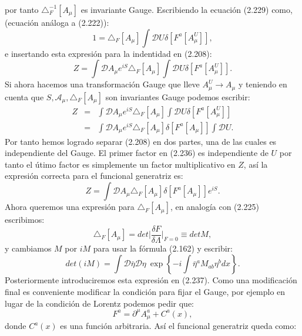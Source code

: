 por tanto $\triangle_{F}^{-1}[A_\mu]$ es invariante Gauge. Escribiendo la ecuación (2.229) como, (ecuación análoga a (2.222)):
\begin{equation}
1=\triangle_{F}[A_{\mu}]\int\mathcal{D}U\delta[F^{a}[A_{\mu}^{U}]],
\end{equation}
e insertando esta expresión para la indentidad en (2.208):
\begin{equation}
Z=\int\mathcal{D}A_{\mu}e^{iS}\triangle_{F}[A_{\mu}]\int\mathcal{D}U\delta[F^{a}[A_{\mu}^{U}]].
\end{equation}
Si ahora hacemos una transformación Gauge que lleve $A_{\mu}^{U} \to A_\mu$ y teniendo en cuenta que $S,\mathcal{A_\mu}, \triangle_{F}[A_{\mu}] $ son invariantes Gauge podemos escribir:
\begin{eqnarray}
\nonumber Z&=&\int\mathcal{D}A_{\mu}e^{iS}\triangle_{F}[A_{\mu}]\int\mathcal{D}U\delta[F^{a}[A_{\mu}^{U}]]\\
&=&\int\mathcal{D}A_{\mu}e^{iS}\triangle_{F}[A_{\mu}]\delta[F^{a}[A_{\mu}]]\int\mathcal{D}U.
\end{eqnarray}
Por tanto hemos logrado separar (2.208) en dos partes, una de las cuales es independiente del Gauge. El primer factor en (2.236) es independiente de $U $ por tanto el útimo factor es simplemente un factor multiplicativo en $Z$, así la expresión correcta para el funcional generatriz es:
\begin{equation}
Z=\int\mathcal{D}A_{\mu}\triangle_{F}[A_{\mu}]\delta[F^{a}[A_{\mu}]]e^{iS}.
\end{equation}
Ahora queremos una expresión para $ \triangle_{F}[A_{\mu}]$, en analogía con (2.225) escribimos:
\begin{equation}
\triangle_{F}[A_{\mu}]=det\bigg|\frac{\delta F}{\delta\Lambda}\bigg|_{F=0}\equiv detM,
\end{equation} 
y cambiamos $M$ por $iM$ para usar la fórmula (2.162) y escribir:
\begin{equation}
det(iM)=\int\mathcal{D}\bar{\eta}\mathcal{D}\eta\ \exp\left\{ -i\int\bar{\eta}^{a}M_{ab}\eta^{b}dx\right\} .
\end{equation}
Posteriormente introduciremos esta expresión en (2.237). Como una modificación final es conveniente modificar la condición para fijar el Gauge, por ejemplo en lugar de la condición de Lorentz podemos pedir que:
\begin{equation}
F^a=\partial^\mu A_{\mu}^{a}+C^a(x),
\end{equation} 
donde $C^a(x)$ es una función arbitraria. Así el funcional generatriz queda como:
